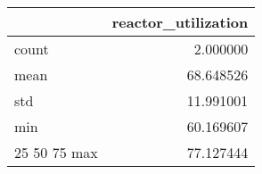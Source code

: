 \begin{tabular}{lr}
\toprule
 & reactor\_utilization \\
\midrule
count & 2.000000 \\
mean & 68.648526 \\
std & 11.991001 \\
min & 60.169607 \\
25%
50%
75%
max & 77.127444 \\
\bottomrule
\end{tabular}

